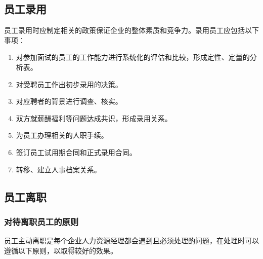 \subsection {员工录用}

    员工录用时应制定相关的政策保证企业的整体素质和竞争力。录用员工应包括以下事项：

    \begin{enumerate}
        \item 对参加面试的员工的工作能力进行系统化的评估和比较，形成定性、定量的分析表。

        \item 对受聘员工作出初步录用的决策。

        \item 对应聘者的背景进行调查、核实。

        \item 双方就薪酬福利等问题达成共识，形成录用关系。

        \item 为员工办理相关的人职手续。

        \item 签订员工试用期合同和正式录用合同。

        \item 转移、建立人事档案关系。
    \end{enumerate}

\subsection {员工离职}

\subsubsection {对待离职员工的原则}

    员工主动离职是每个企业人力资源经理都会遇到且必须处理酌问题，在处理时可以遵循以下原则，以取得较好的效果。

